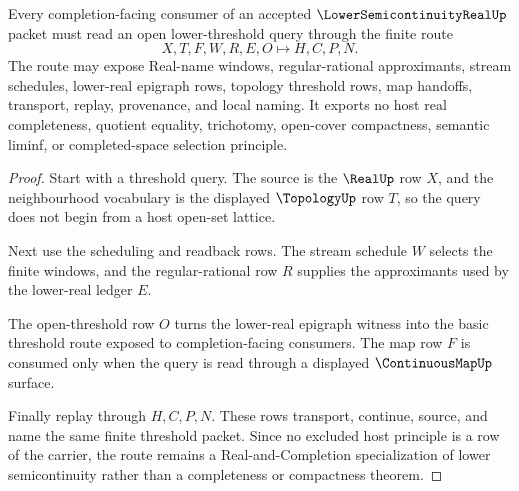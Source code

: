 \begin{theorem}
\label{thm:lower-semicontinuity-real-open-threshold-route}
Every completion-facing consumer of an accepted
$\LowerSemicontinuityRealUp$ packet must read an open lower-threshold query
through the finite route
$$
X,T,F,W,R,E,O \longmapsto H,C,P,N .
$$
The route may expose Real-name windows, regular-rational approximants,
stream schedules, lower-real epigraph rows, topology threshold rows, map
handoffs, transport, replay, provenance, and local naming. It exports no host
real completeness, quotient equality, trichotomy, open-cover compactness,
semantic liminf, or completed-space selection principle.
\end{theorem}
\begin{proof}
Start with a threshold query. The source is the $\RealUp$ row $X$, and the
neighbourhood vocabulary is the displayed $\TopologyUp$ row $T$, so the query
does not begin from a host open-set lattice.

Next use the scheduling and readback rows. The stream schedule $W$ selects the
finite windows, and the regular-rational row $R$ supplies the approximants
used by the lower-real ledger $E$.

The open-threshold row $O$ turns the lower-real epigraph witness into the
basic threshold route exposed to completion-facing consumers. The map row $F$
is consumed only when the query is read through a displayed
$\ContinuousMapUp$ surface.

Finally replay through $H,C,P,N$. These rows transport, continue, source, and
name the same finite threshold packet. Since no excluded host principle is a
row of the carrier, the route remains a Real-and-Completion specialization of
lower semicontinuity rather than a completeness or compactness theorem.
\end{proof}

\begin{closurestatus}{\LowerSemicontinuityRealUp}
  \theoryclosure{\seedClosure}
  \formalstatus{\unformalizedV}
\end{closurestatus}
